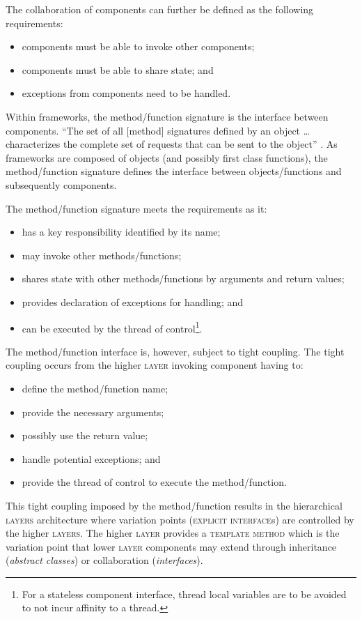 \documentclass[prodmode]{style/acmlarge}
\begin{document}
The collaboration of components can further be defined as the following
requirements:
\begin{itemize}
  \item components must be able to invoke other components;
  \item components must be able to share state; and
  \item exceptions from components need to be handled.
\end{itemize}

Within frameworks, the method/function signature is the interface between
components.  ``The set of all [method] signatures defined by an object \ldots
characterizes the complete set of requests that can be sent to the object''
\cite[p. 13]{gof}.  As frameworks are composed of objects (and possibly first
class functions), the method/function signature defines the interface between
objects/functions and subsequently components.

The method/function signature meets the requirements as it:
\begin{itemize}
  \item has a key responsibility identified by its name;
  \item may invoke other methods/functions;
  \item shares state with other methods/functions by arguments and return values;
  \item provides declaration of exceptions for handling; and
  \item can be executed by the thread of control\footnote{For a stateless component interface, thread local variables are to be avoided to not incur affinity to a thread.}.
\end{itemize}

The method/function interface is, however, subject to tight coupling.  The tight
coupling occurs from the higher \textsc{layer} invoking component having to:
\begin{itemize}
  \item define the method/function name;
  \item provide the necessary arguments;
  \item possibly use the return value;
  \item handle potential exceptions; and
  \item provide the thread of control to execute the method/function.
\end{itemize}

This tight coupling imposed by the method/function results in the hierarchical
\textsc{layers} architecture where variation points (\textsc{explicit
interface}s) are controlled by the higher \textsc{layers}.  The higher
\textsc{layer} provides a \textsc{template method} \cite{gof} which is the
variation point that lower \textsc{layer} components may extend through
inheritance (\textit{abstract classes}) or collaboration (\textit{interfaces}).
\end{document}
